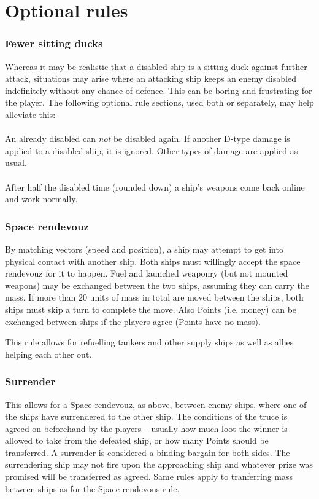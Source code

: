 \documentclass[a4paper,12pt,notitlepage,twocolumn]{article}
\begin{document}
\section{Optional rules}
\label{sec:optional_rules}


\subsubsection*{Fewer sitting ducks}

Whereas it may be realistic that a disabled ship is a sitting duck
against further attack, situations may arise where an attacking ship
keeps an enemy disabled indefinitely without any chance of
defence. This can be boring and frustrating for the player. The
following optional rule sections, used both or separately, may help
alleviate this:  
\\\\
An already disabled can \emph{not} be disabled again. If another
D-type damage is applied to a disabled ship, it is ignored. Other
types of damage are applied as usual. 
\\\\
After half the disabled time (rounded down) a ship's weapons come back
online and work normally.


\subsubsection*{Space rendevouz}

By matching vectors (speed and position), a ship may attempt to get
into physical contact with another ship.  Both ships must willingly
accept the space rendevouz for it to happen. Fuel and launched
weaponry (but not mounted weapons) may be exchanged between the two
ships, assuming they can carry the mass. If more than 20 units of mass
in total are moved between the ships, both ships must skip a turn to
complete the move. Also Points (i.e. money) can be exchanged between ships if the
players agree (Points have no mass). 

This rule allows for refuelling tankers and other supply ships as well
as allies helping each other out. 

\subsubsection*{Surrender}

This allows for a Space rendevouz, as above, between enemy ships,
where one of the ships have surrendered to the other ship. The
conditions of the truce is agreed on beforehand by the players --
usually how much loot the winner is allowed to take from the defeated
ship, or how many Points should be transferred. A surrender is
considered a binding bargain for both sides. The surrendering ship may not fire
upon the approaching ship and whatever prize was promised will be
transferred as agreed. Same rules apply to tranferring mass between
ships as for the Space rendevous rule. 
\end{document}

